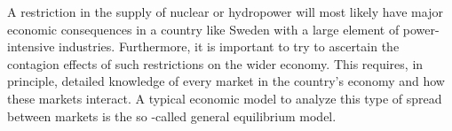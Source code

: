 \documentclass[10pt,a4paper]{article}
\begin{document}
\begin{comment}
Time to time, requirement of imminent nuclear phase out emerge, most recently in a motion for the Swedish parliament (Motion 2013/14:N430) which states that nuclear power is redundant and that Sweden is equipped with means to supply all electricity demand from renewable sources. An other motion for the Swedish parliament (Motion 2013/14:N334) concludes that the Swedish nuclear power is heavily subsidized and urges substantial increases in both upper limits of liability cost of nuclear accidents (9000 percent increase) and mentions an increase of the cost per kilowatt producing set aside for funding nuclear waste storage at 350 percent.

The Swedish nuclear power plants are old and according to current law it is possible to replace them.

Cap on hydropower:
feasible sources wind and biofuels

Assumptions on electricity demand

Motion 2013/14:N430
Kärnkraftsavveckling

Question 1:
Impact on hydropower as both base load and as a regulator of increased intermittent electricity requirement increase...

Motion 2013/14:N334
Avskaffa kärnkraftens subventioner

Question 2:
Ansvarsbelopp 11 GSEK vs 1000 GSEK
Capital adjustment over time in dynamic CGE model bla,bla,bla...

Question 3:
Cost of disposal of nuclear waste
I oktober 2011 föreslog SSM en höjning av den avgift kärnkraftsindustrin betalar till Kärnavfallsfonden från cirka 1 öre/kWh producerad kärnkraftsel till cirka 3 öre/kWh. Den 22 december 2011 beslutade regeringen att endast höja avgiften till 2,2 öre/kWh. Under 2013 meddelade Kärnavfallsfonden att det ändå saknas över 30 miljarder kronor för att de avsatta pengarna ska räcka till slutförvaret av det svenska kärnavfallet. Enligt en uträkning som Sveriges Radio Vetenskapsradion låtit göra skulle avgiften behöva femfaldigas till runt 10 öre/kWh för att täcka upp underskottet i Kärnavfallsfonden.
\end{comment}


A restriction in the supply of nuclear or hydropower will most likely have major economic consequences in a country like Sweden with a large element of power-intensive industries. Furthermore, it is important to try to ascertain the contagion effects of such restrictions on the wider economy. This requires, in principle, detailed knowledge of every market in the country's economy and how these markets interact. A typical economic model to analyze this type of spread between markets is the so -called general equilibrium model.
\end{document}

